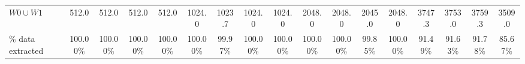 \begin{table*}
{\begin{tabular}{|lcccccccccccccccc|}
\multicolumn{1}{|l|}{\textbf{$W0 \cup W1$}}          & 512.0                      & 512.0                      & 512.0                      & 512.0                      & 1024.0                     & 1023.7                     & 1024.0                     & 1024.0                     & 2048.0                     & 2048.0                     & 2045.0                     & 2048.0                     & 3747.3                     & 3753.0                     & 3759.3                     & 3509.0                      \\
\multicolumn{1}{|l|}{\% data extracted} & 100.00\%                   & 100.00\%                   & 100.00\%                   & 100.00\%                   & 100.00\%                   & 99.97\%                    & 100.00\%                   & 100.00\%                   & 100.00\%                   & 100.00\%                   & 99.85\%                    & 100.00\%                   & 91.49\%                    & 91.63\%                    & 91.78\%                    & 85.67\%                     \\ \hline
\end{tabular}
}


\end{table*}